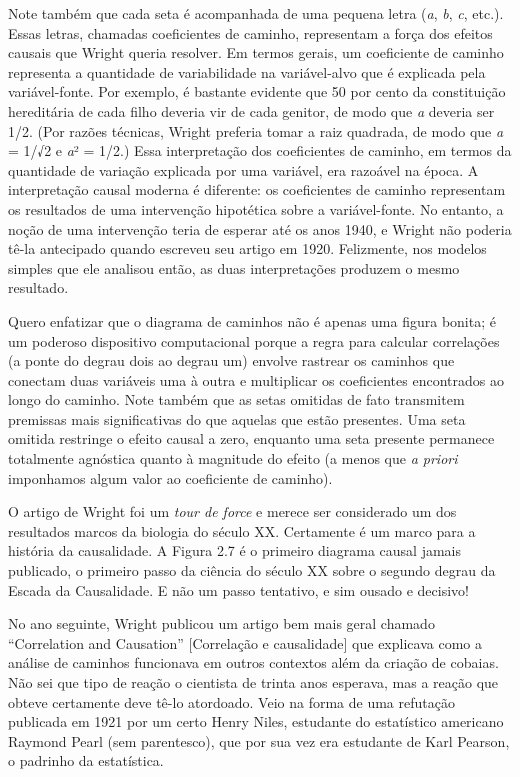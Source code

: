 \documentclass[11pt,a5paper,twoside]{book}
\begin{document}
Note também que cada seta é acompanhada de uma pequena letra (\textit{a}, \textit{b}, \textit{c}, etc.). Essas letras, chamadas coeficientes de caminho, representam a força dos efeitos causais que Wright queria resolver. Em termos gerais, um coeficiente de caminho representa a quantidade de variabilidade na variável-alvo que é explicada pela variável-fonte. Por exemplo, é bastante evidente que 50 por cento da constituição hereditária de cada filho deveria vir de cada genitor, de modo que \textit{a} deveria ser 1/2. (Por razões técnicas, Wright preferia tomar a raiz quadrada, de modo que \textit{a} = 1/√2 e \textit{a}² = 1/2.) Essa interpretação dos coeficientes de caminho, em termos da quantidade de variação explicada por uma variável, era razoável na época. A interpretação causal moderna é diferente: os coeficientes de caminho representam os resultados de uma intervenção hipotética sobre a variável-fonte. No entanto, a noção de uma intervenção teria de esperar até os anos 1940, e Wright não poderia tê-la antecipado quando escreveu seu artigo em 1920. Felizmente, nos modelos simples que ele analisou então, as duas interpretações produzem o mesmo resultado.

Quero enfatizar que o diagrama de caminhos não é apenas uma figura bonita; é um poderoso dispositivo computacional porque a regra para calcular correlações (a ponte do degrau dois ao degrau um) envolve rastrear os caminhos que conectam duas variáveis uma à outra e multiplicar os coeficientes encontrados ao longo do caminho. Note também que as setas omitidas de fato transmitem premissas mais significativas do que aquelas que estão presentes. Uma seta omitida restringe o efeito causal a zero, enquanto uma seta presente permanece totalmente agnóstica quanto à magnitude do efeito (a menos que \textit{a priori} imponhamos algum valor ao coeficiente de caminho).

O artigo de Wright foi um \textit{tour de force} e merece ser considerado um dos resultados marcos da biologia do século XX. Certamente é um marco para a história da causalidade. A Figura 2.7 é o primeiro diagrama causal jamais publicado, o primeiro passo da ciência do século XX sobre o segundo degrau da Escada da Causalidade. E não um passo tentativo, e sim ousado e decisivo!

No ano seguinte, Wright publicou um artigo bem mais geral chamado “Correlation and Causation” [Correlação e causalidade] que explicava como a análise de caminhos funcionava em outros contextos além da criação de cobaias. Não sei que tipo de reação o cientista de trinta anos esperava, mas a reação que obteve certamente deve tê-lo atordoado. Veio na forma de uma refutação publicada em 1921 por um certo Henry Niles, estudante do estatístico americano Raymond Pearl (sem parentesco), que por sua vez era estudante de Karl Pearson, o padrinho da estatística.
\end{document}
